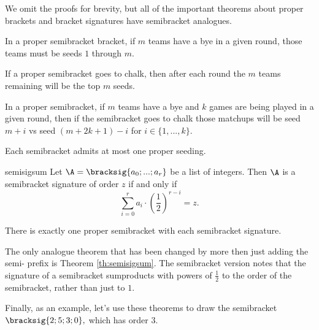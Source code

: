 {    We omit the proofs for brevity, but all of the important theorems about proper brackets and bracket signatures have semibracket analogues.

    \begin{lemma}{}{}
        In a proper semibracket bracket, if $m$ teams have a bye in a given round, those teams must be seeds $1$ through $m$.
    \end{lemma}

    \begin{lemma}{}{}
        If a proper semibracket goes to chalk, then after each round the $m$ teams remaining will be the top $m$ seeds.
    \end{lemma}

    \begin{lemma}{}{}
        In a proper semibracket, if $m$ teams have a bye and $k$ games are being played in a given round, then if the semibracket goes to chalk those matchups will be seed $m + i$ vs seed $(m + 2k + 1) - i$ for $i \in \{1, ..., k\}.$
    \end{lemma}

    \begin{theorem}{}{}
        Each semibracket admits at most one proper seeding.
    \end{theorem}

    \begin{theorem}{}{semisigsum}
    Let $\A = \bracksig{a_0; ...; a_r}$ be a list of integers. Then $\A$ is a semibracket signature of order $z$ if and only if $$\sum_{i=0}^r a_i \cdot \left(\frac{1}{2}\right)^{r - i} = z.$$
    \end{theorem}

    \begin{theorem}{}{}
        There is exactly one proper semibracket with each semibracket signature.
    \end{theorem}

    The only analogue theorem that has been changed by more then just adding the semi- prefix is Theorem \ref{th:semisigsum}. The semibracket version notes that the signature of a semibracket sumproducts with powers of $\frac{1}{2}$ to the order of the semibracket, rather than just to $1.$

    Finally, as an example, let's use these theorems to draw the semibracket $\bracksig{2;5;3;0},$ which has order $3.$

}